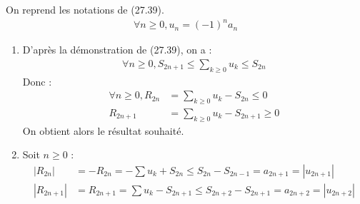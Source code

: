 \documentclass[../main.tex]{subfiles}
\begin{document}
\noindent On reprend les notations de (27.39). \\
\begin{align*}
    \forall n\geq 0, u_n = (-1)^n a_n
\end{align*}
\begin{enumerate}
    \item D'après la démonstration de (27.39), on a : 
    \begin{align*}
        \forall n\geq 0, S_{2n+1} \leq \sum_{k\geq 0} u_k \leq S_{2n}
    \end{align*}
    Donc :
    \begin{align*}
        \forall n\geq 0, R_{2n} &= \sum_{k\geq 0} u_k - S_{2n} \leq 0 \\
        R_{2n+1} &= \sum_{k\geq 0} u_k - S_{2n+1} \geq 0
    \end{align*}
    On obtient alors le résultat souhaité. 
    \item Soit $n\geq 0$ : 
    \begin{align*}
        |R_{2n}| &= -R_{2n} = -\sum u_k + S_{2n}  \leq S_{2n} - S_{2n-1} = a_{2n+1} = |u_{2n+1}| \\
        |R_{2n+1}| &= R_{2n+1} = \sum u_k - S_{2n+1} \leq S_{2n+2} - S_{2n+1} = a_{2n+2} = |u_{2n+2}|
    \end{align*}
\end{enumerate}
\end{document}
